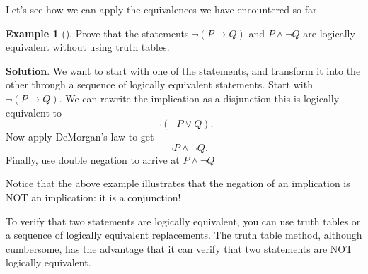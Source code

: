 \documentclass[10pt,]{book}
\theoremstyle{plain}
\theoremstyle{definition}
\theoremstyle{definition}
\newtheorem{example}[theorem]{Example}
\theoremstyle{definition}
\theoremstyle{definition}
\numberwithin{equation}{chapter}
\def\imp{\rightarrow}
\begin{document}
\hypertarget{p-1925}{}%
Let's see how we can apply the equivalences we have encountered so far.%
\begin{example}[]\label{example-58}
\hypertarget{p-1926}{}%
Prove that the statements \(\neg(P \imp Q)\) and \(P\wedge \neg Q\) are logically equivalent without using truth tables.%
\par\smallskip%
\noindent\textbf{Solution}.\hypertarget{solution-170}{}\quad%
\hypertarget{p-1927}{}%
We want to start with one of the statements, and transform it into the other through a sequence of logically equivalent statements. Start with \(\neg(P \imp Q)\). We can rewrite the implication as a disjunction this is logically equivalent to%
\begin{equation*}
\neg(\neg P \vee Q).
\end{equation*}
Now apply DeMorgan's law to get%
\begin{equation*}
\neg\neg P \wedge \neg Q.
\end{equation*}
Finally, use double negation to arrive at \(P \wedge \neg Q\)%
\end{example}
\hypertarget{p-1928}{}%
Notice that the above example illustrates that the negation of an implication is NOT an implication: it is a conjunction!%
\par
\hypertarget{p-1929}{}%
To verify that two statements are logically equivalent, you can use truth tables or a sequence of logically equivalent replacements. The truth table method, although cumbersome, has the advantage that it can verify that two statements are NOT logically equivalent.%
\end{document}
